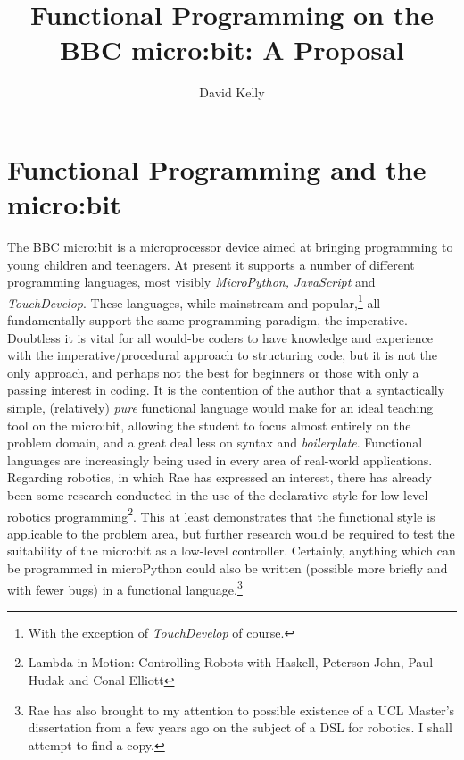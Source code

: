 \documentclass[11pt, a4paper]{article}
\begin{document}
\title{Functional Programming on the BBC micro:bit: A Proposal}
\author{David Kelly}

\maketitle

\section{Functional Programming and the micro:bit} The BBC micro:bit is a microprocessor device aimed at
bringing programming to young children and teenagers. At present it supports a number of 
different programming languages, most visibly \textit{MicroPython, JavaScript} and \textit{TouchDevelop}.
These languages, while mainstream and popular,\footnote{With the exception of \textit{TouchDevelop}
    of course.} all fundamentally support the same programming paradigm, the imperative. Doubtless it is
vital for all would-be coders to have knowledge and experience with the imperative/procedural
approach to structuring code, but it is not the only approach, and perhaps not the best for
beginners or those with only a passing interest in coding. It is the contention of the author that a
syntactically simple, (relatively) \textit{pure} functional language would make for an ideal 
teaching tool on the micro:bit, allowing the student to focus almost entirely on the problem domain, 
and a great deal less on syntax and \textit{boilerplate}.
Functional languages are increasingly being used in every area of real-world applications. Regarding 
robotics, in which Rae has expressed an interest, there has already been some research conducted 
in the use of the declarative style for low level robotics programming\footnote{Lambda in Motion: Controlling
    Robots with Haskell, Peterson John, Paul Hudak and Conal Elliott}. This at least demonstrates
that the functional style is applicable to the problem area, but further research would be required
to test the suitability of the micro:bit as a low-level controller. Certainly, anything which can be
programmed in microPython could also be written (possible more briefly and with fewer bugs) in a
functional language.\footnote{Rae has also brought to my attention to possible existence of a
    UCL Master's dissertation from a few years ago on the subject of a DSL for robotics. I shall
    attempt to find a copy.}
\end{document}
